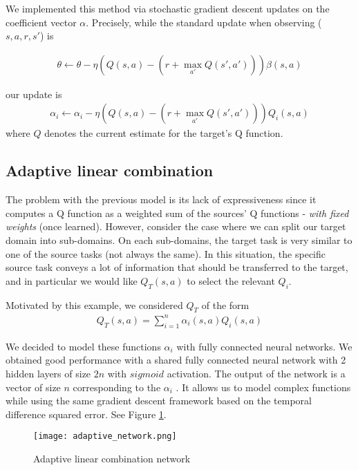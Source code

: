 \documentclass{article}
\begin{document}
\noindent We implemented this method via stochastic gradient descent updates on the coefficient vector $\alpha$. Precisely, while the standard update when observing ($s,a,r,s'$) is 

\begin{align}
\theta \leftarrow \theta - \eta \left(Q(s,a) - (r + \max_{a'} Q(s', a')) \right) \beta(s,a)
\end{align}\label{eq:base_ql}

our update is 
\begin{align}
\alpha_i \leftarrow \alpha_i - \eta \left(Q(s,a) - (r + \max_{a'} Q(s', a')) \right) Q_i(s,a)
\end{align}
where $Q$ denotes the current estimate for the target's Q function.


\subsection{Adaptive linear combination}\label{sec__adaptive}
The problem with the previous model is its lack of expressiveness since it computes a Q function as a weighted sum of the sources' Q functions - \textit{with fixed weights} (once learned).
However, consider the case where we can split our target domain into sub-domains. On each sub-domains, the target task is very similar to one of the source tasks (not always the same). In this situation, the specific source task conveys a lot of information that should be transferred to the target, and in particular we would like $Q_{T}(s,a)$ to select the relevant $Q_i$. 

Motivated by this example, we considered $Q_{T}$ of the form
\begin{align}
Q_{T}(s,a) = \sum_{i=1}^{n} \alpha_i(s,a) Q_i(s,a)
\end{align}

We decided to model these functions $\alpha_i$ with fully connected neural networks.  We obtained good performance with a shared fully connected neural network with 2 hidden layers of size $ 2 n $ with $ sigmoid$ activation. The output of the network is a vector of size $ n$ corresponding to the $ \alpha_i$ . It allows us to model complex functions while using the same gradient descent framework based on the temporal difference squared error. See Figure \ref{fig:adaptive_network}.

\begin{figure}
\texttt{[image: adaptive\_network.png]}
\caption{Adaptive linear combination network}
\label{fig:adaptive_network}
\end{figure}
\end{document}

